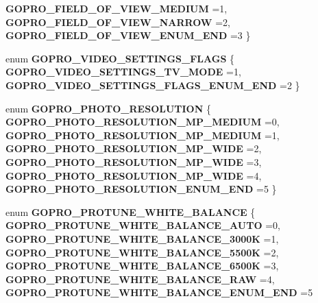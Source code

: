 \begin{DoxyCompactItemize}
\textbf{ G\+O\+P\+R\+O\+\_\+\+F\+I\+E\+L\+D\+\_\+\+O\+F\+\_\+\+V\+I\+E\+W\+\_\+\+M\+E\+D\+I\+UM} =1, 
\textbf{ G\+O\+P\+R\+O\+\_\+\+F\+I\+E\+L\+D\+\_\+\+O\+F\+\_\+\+V\+I\+E\+W\+\_\+\+N\+A\+R\+R\+OW} =2, 
\textbf{ G\+O\+P\+R\+O\+\_\+\+F\+I\+E\+L\+D\+\_\+\+O\+F\+\_\+\+V\+I\+E\+W\+\_\+\+E\+N\+U\+M\+\_\+\+E\+ND} =3
 \}
\item 
enum \textbf{ G\+O\+P\+R\+O\+\_\+\+V\+I\+D\+E\+O\+\_\+\+S\+E\+T\+T\+I\+N\+G\+S\+\_\+\+F\+L\+A\+GS} \{ \textbf{ G\+O\+P\+R\+O\+\_\+\+V\+I\+D\+E\+O\+\_\+\+S\+E\+T\+T\+I\+N\+G\+S\+\_\+\+T\+V\+\_\+\+M\+O\+DE} =1, 
\textbf{ G\+O\+P\+R\+O\+\_\+\+V\+I\+D\+E\+O\+\_\+\+S\+E\+T\+T\+I\+N\+G\+S\+\_\+\+F\+L\+A\+G\+S\+\_\+\+E\+N\+U\+M\+\_\+\+E\+ND} =2
 \}
\item 
enum \textbf{ G\+O\+P\+R\+O\+\_\+\+P\+H\+O\+T\+O\+\_\+\+R\+E\+S\+O\+L\+U\+T\+I\+ON} \{ \newline
\textbf{ G\+O\+P\+R\+O\+\_\+\+P\+H\+O\+T\+O\+\_\+\+R\+E\+S\+O\+L\+U\+T\+I\+O\+N\+\_\+M\+P\+\_\+\+M\+E\+D\+I\+UM} =0, 
\textbf{ G\+O\+P\+R\+O\+\_\+\+P\+H\+O\+T\+O\+\_\+\+R\+E\+S\+O\+L\+U\+T\+I\+O\+N\+\_\+M\+P\+\_\+\+M\+E\+D\+I\+UM} =1, 
\textbf{ G\+O\+P\+R\+O\+\_\+\+P\+H\+O\+T\+O\+\_\+\+R\+E\+S\+O\+L\+U\+T\+I\+O\+N\+\_\+M\+P\+\_\+\+W\+I\+DE} =2, 
\textbf{ G\+O\+P\+R\+O\+\_\+\+P\+H\+O\+T\+O\+\_\+\+R\+E\+S\+O\+L\+U\+T\+I\+O\+N\+\_\+M\+P\+\_\+\+W\+I\+DE} =3, 
\newline
\textbf{ G\+O\+P\+R\+O\+\_\+\+P\+H\+O\+T\+O\+\_\+\+R\+E\+S\+O\+L\+U\+T\+I\+O\+N\+\_\+M\+P\+\_\+\+W\+I\+DE} =4, 
\textbf{ G\+O\+P\+R\+O\+\_\+\+P\+H\+O\+T\+O\+\_\+\+R\+E\+S\+O\+L\+U\+T\+I\+O\+N\+\_\+\+E\+N\+U\+M\+\_\+\+E\+ND} =5
 \}
\item 
enum \textbf{ G\+O\+P\+R\+O\+\_\+\+P\+R\+O\+T\+U\+N\+E\+\_\+\+W\+H\+I\+T\+E\+\_\+\+B\+A\+L\+A\+N\+CE} \{ \newline
\textbf{ G\+O\+P\+R\+O\+\_\+\+P\+R\+O\+T\+U\+N\+E\+\_\+\+W\+H\+I\+T\+E\+\_\+\+B\+A\+L\+A\+N\+C\+E\+\_\+\+A\+U\+TO} =0, 
\textbf{ G\+O\+P\+R\+O\+\_\+\+P\+R\+O\+T\+U\+N\+E\+\_\+\+W\+H\+I\+T\+E\+\_\+\+B\+A\+L\+A\+N\+C\+E\+\_\+3000K} =1, 
\textbf{ G\+O\+P\+R\+O\+\_\+\+P\+R\+O\+T\+U\+N\+E\+\_\+\+W\+H\+I\+T\+E\+\_\+\+B\+A\+L\+A\+N\+C\+E\+\_\+5500K} =2, 
\textbf{ G\+O\+P\+R\+O\+\_\+\+P\+R\+O\+T\+U\+N\+E\+\_\+\+W\+H\+I\+T\+E\+\_\+\+B\+A\+L\+A\+N\+C\+E\+\_\+6500K} =3, 
\newline
\textbf{ G\+O\+P\+R\+O\+\_\+\+P\+R\+O\+T\+U\+N\+E\+\_\+\+W\+H\+I\+T\+E\+\_\+\+B\+A\+L\+A\+N\+C\+E\+\_\+\+R\+AW} =4, 
\textbf{ G\+O\+P\+R\+O\+\_\+\+P\+R\+O\+T\+U\+N\+E\+\_\+\+W\+H\+I\+T\+E\+\_\+\+B\+A\+L\+A\+N\+C\+E\+\_\+\+E\+N\+U\+M\+\_\+\+E\+ND} =5

\end{DoxyCompactItemize}
